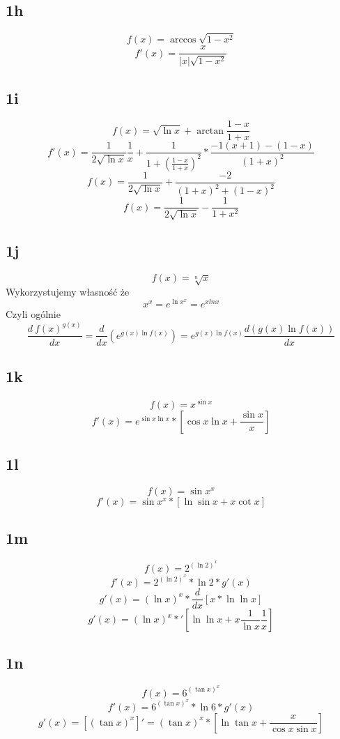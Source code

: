 \documentclass{article}
\begin{document}
\subsection{1h}
$$f(x) = \arccos{\sqrt{1-x^2}} $$
$$f'(x) = \frac{x}{|x|\sqrt{1-x^2 }}$$

\subsection{1i}
$$f(x) = \sqrt{\ln{x}} + \arctan{\frac{1-x}{1+x}} $$
$$f'(x) = \frac{1}{2\sqrt{\ln{x}}} \frac{1}{x}  + \frac{1}{1+(\frac{1-x}{1+x})^2} * \frac{-1(x+1) - (1-x)}{(1+x)^2} $$
$$f(x) = \frac{1}{2\sqrt{\ln{x}}} + \frac{-2}{(1+x)^2 + ( 1 - x )^2} $$
$$f(x) = \frac{1}{2\sqrt{\ln{x}}} - \frac{1}{1+x^2} $$

\subsection{1j}
$$f(x) = \sqrt[n]{x} $$
Wykorzystujemy własność że $$x^x = e^{\ln{x^x}} = e^{x ln x} $$
Czyli ogólnie $$ \frac{d\ f(x)^{g(x)}}{dx} = \frac{d}{dx}\left( e^{g(x) \ln{f(x)}} \right) 
= e^{g(x) \ln{f(x)}} \frac{d\left( g(x) \ln{f(x)} \right)}{dx}$$
 
\subsection{1k}
$$f(x) = x^{\sin{x}} $$
$$f'(x) = e^{\sin{x} \ln{x}} * \left[ \cos{x}\ln{x} + \frac{\sin{x}}{x} \right] $$

\subsection{1l}
$$f(x) = {\sin{x}}^x $$
$$f'(x) = {\sin{x}}^{x} * 
\left[ \ln{\sin{x}} + x \cot{x} \right] $$

\subsection{1m}
$$f(x) = 2^{({\ln{2}})^x} $$
$$f'(x) = 2^{({\ln{2}})^x} * \ln{2} * g'(x)$$
$$g'(x) = (\ln{x})^x * \frac{d}{dx}\left[ x * \ln{\ln{x}} \right] $$
$$g'(x) = (\ln{x})^x * '\left[ \ln{\ln{x}} + x\frac{1}{\ln{x}} \frac{1}{x} \right] $$

\subsection{1n}
$$f(x) = 6^{(\tan{x})^x} $$
$$f'(x) = 6^{(\tan{x})^x} * \ln{6} * g'(x)$$
$$g'(x) = \left[(\tan{x})^x\right]' =  (\tan{x})^x *\left[ \ln{\tan{x}} + \frac{x}{\cos{x} \sin{x}}\right]$$
\end{document}
